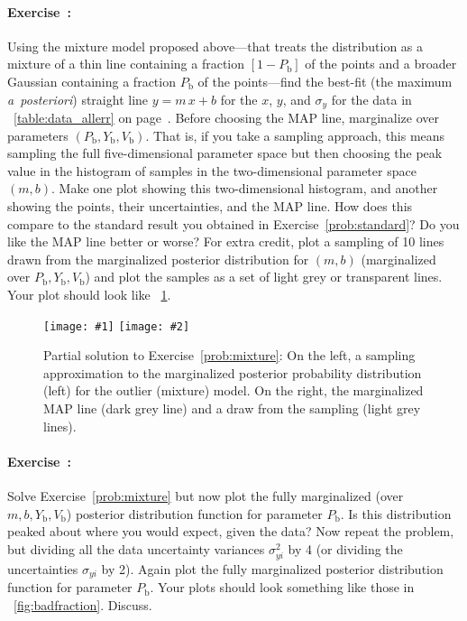 \documentclass[12pt,twoside,pdftex]{article}
\newcommand{\exampleplottwo}[2]{%
\begin{center}%
\texttt{[image: \#1]}%
\texttt{[image: \#2]}%
\end{center}%
}
\newcommand{\notenglish}[1]{\textsl{#1}}
\newcommand{\aposteriori}{\notenglish{a~posteriori}}
\newcommand{\problemname}{Exercise}
\newcounter{problem}
\newenvironment{problem}{\paragraph{\problemname~\theproblem:}\refstepcounter{problem}}{}
\newcommand{\Pbad}{P_{\mathrm{b}}}
\newcommand{\Ybad}{Y_{\mathrm{b}}}
\newcommand{\Vbad}{V_{\mathrm{b}}}
\begin{document}
\begin{problem}\label{prob:mixture}
Using the mixture model proposed above---that treats the distribution
as a mixture of a thin line containing a fraction $[1-\Pbad]$ of the
points and a broader Gaussian containing a fraction $\Pbad$ of the
points---find the best-fit (the maximum \aposteriori) straight line
$y=m\,x+b$ for the $x$, $y$, and $\sigma_y$ for the data in
\tablename~\ref{table:data_allerr} on
page~\pageref{table:data_allerr}.  Before choosing the MAP line,
marginalize over parameters $(\Pbad,\Ybad,\Vbad)$.  That is, if you
take a sampling approach, this means sampling the full
five-dimensional parameter space but then choosing the peak value in
the histogram of samples in the two-dimensional parameter space
$(m,b)$.  Make one plot showing this two-dimensional histogram, and
another showing the points, their uncertainties, and the MAP line.
How does this compare to the standard result you obtained in
\problemname~\ref{prob:standard}?  Do you like the MAP line better or
worse?  For extra credit, plot a sampling of 10 lines drawn from the
marginalized posterior distribution for $(m,b)$ (marginalized over
$\Pbad,\Ybad,\Vbad$) and plot the samples as a set of light grey or
transparent lines.  Your plot should look like
\figurename~\ref{fig:mixture}.
\end{problem}

\begin{figure}[htbp]
\exampleplottwo{exMix1a}{exMix1b}
\caption{Partial solution to \problemname~\ref{prob:mixture}: On the
left, a sampling approximation to the marginalized posterior
probability distribution (left) for the outlier (mixture) model.  On
the right, the marginalized MAP line (dark grey line) and a draw from
the sampling (light grey lines).}\label{fig:mixture}
\end{figure}

\begin{problem}\label{prob:badfraction}
Solve \problemname~\ref{prob:mixture} but now plot the fully
marginalized (over $m,b,\Ybad,\Vbad$) posterior distribution function
for parameter $\Pbad$.  Is this distribution peaked about where you
would expect, given the data?  Now repeat the problem, but dividing
all the data uncertainty variances $\sigma_{yi}^2$ by 4 (or dividing
the uncertainties $\sigma_{yi}$ by 2).  Again plot the fully
marginalized posterior distribution function for parameter $\Pbad$.
Your plots should look something like those in
\figurename~\ref{fig:badfraction}.  Discuss.
\end{problem}
\end{document}
